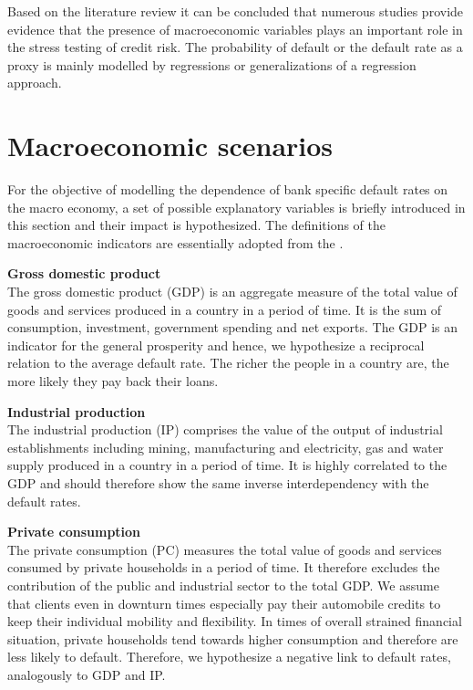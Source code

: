 \documentclass[a4paper, 11pt]{scrreprt}
\begin{document}
Based on the literature review it can be concluded that numerous studies provide evidence that the presence of macroeconomic variables plays an important role in the stress testing of credit risk. The probability of default or the default rate as a proxy is mainly modelled by regressions or generalizations of a regression approach.



\section{Macroeconomic scenarios}\label{par:scenarios}

For the objective of modelling the dependence of bank specific default rates on the macro economy, a set of possible explanatory variables is briefly introduced in this section and their impact is hypothesized.
The definitions of the macroeconomic indicators are essentially adopted from the \textcite{oecd2016factbook}.

\bigskip 

\textbf{Gross domestic product} \\
The gross domestic product (GDP) is an aggregate measure of the total value of goods and services produced in a country in a period of time. It is the sum of consumption, investment, government spending and net exports. The GDP is an indicator for the general prosperity and hence, we hypothesize a reciprocal relation to the average default rate. The richer the people in a country are, the more likely they pay back their loans.

\bigskip 

\textbf{Industrial production} \\
The industrial production (IP) comprises the value of the output of industrial establishments including mining, manufacturing and electricity, gas and water supply produced in a country in a period of time. It is highly correlated to the GDP and should therefore show the same inverse interdependency with the default rates.

\bigskip

\textbf{Private consumption} \\
The private consumption (PC) measures the total value of goods and services consumed by private households in a period of time. It therefore excludes the contribution of the public and industrial sector to the total GDP. 
We assume that clients even in downturn times especially pay their automobile credits to keep their individual mobility and flexibility. 
In times of overall strained financial situation, private households tend towards higher consumption and therefore are less likely to default. 
Therefore, we hypothesize a negative link to default rates, analogously to GDP and IP. 
\end{document}
